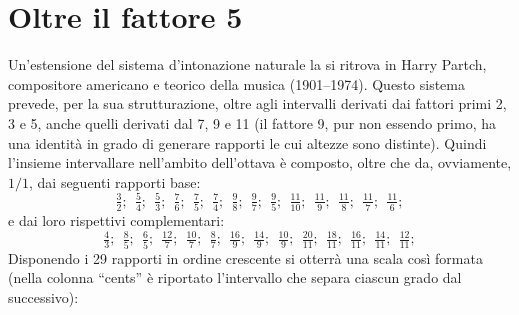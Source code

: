 \newcommand{\diagfr}[2]{\ensuremath{\tfrac{#1}{#2}}}
\newcommand{\diagdist}[7]{%
  \begin{tikzpicture}[x=1.05cm,y=1cm,font=\scriptsize]
    \def\W{2.1}
    \draw[<->,dashed] (0.05,1.15) -- (\W-0.05,1.15);
    \node[above] at (\W/2,1.18) {(#1 cents)};
    \node at (\W/2,0.62) {$#2$};
    \draw (0,0) -- (\W,0);
    \foreach \x in {0,{\W/2},\W}{\draw (\x,-0.09) -- (\x,0.09);}
    \node[above] at (0,0.09) {$#3$};
    \node[above] at (\W,0.09) {$#5$};
    \node[below] at (\W/2,-0.42) {$#4$};
    \node[below] at (\W/4,-0.09) {#6};
    \node[below] at (3*\W/4,-0.09) {#7};
  \end{tikzpicture}%
}
\section{Oltre il fattore 5}

Un'estensione del sistema d'intonazione naturale la si ritrova in Harry Partch,
compositore americano e teorico della musica (1901--1974). Questo sistema
prevede, per la sua strutturazione, oltre agli intervalli derivati dai fattori
primi 2, 3 e 5, anche quelli derivati dal 7, 9 e 11 (il fattore 9, pur non
essendo primo, ha una identità in grado di generare rapporti le cui altezze sono
distinte). Quindi l'insieme intervallare nell'ambito dell'ottava è composto,
oltre che da, ovviamente, $1/1$, dai seguenti rapporti base:
\[
  \tfrac{3}{2};\ \ \tfrac{5}{4};\ \ \tfrac{5}{3};\ \ \tfrac{7}{6};\ \ \tfrac{7}{5};\ \
  \tfrac{7}{4};\ \ \tfrac{9}{8};\ \ \tfrac{9}{7};\ \ \tfrac{9}{5};\ \
  \tfrac{11}{10};\ \ \tfrac{11}{9};\ \ \tfrac{11}{8};\ \ \tfrac{11}{7};\ \ \tfrac{11}{6};
\]
e dai loro rispettivi complementari:
\[
  \tfrac{4}{3};\ \ \tfrac{8}{5};\ \ \tfrac{6}{5};\ \ \tfrac{12}{7};\ \ \tfrac{10}{7};\ \
  \tfrac{8}{7};\ \ \tfrac{16}{9};\ \ \tfrac{14}{9};\ \ \tfrac{10}{9};\ \
  \tfrac{20}{11};\ \ \tfrac{18}{11};\ \ \tfrac{16}{11};\ \ \tfrac{14}{11};\ \ \tfrac{12}{11};
\]
Disponendo i 29 rapporti in ordine crescente si otterrà una scala così formata
(nella colonna ``cents'' è riportato l'intervallo che separa ciascun grado dal
successivo):

